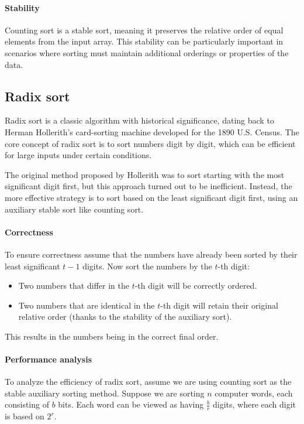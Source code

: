 \paragraph*{Stability}
Counting sort is a stable sort, meaning it preserves the relative order of equal elements from the input array. 
This stability can be particularly important in scenarios where sorting must maintain additional orderings or properties of the data.

\subsection{Radix sort}
Radix sort is a classic algorithm with historical significance, dating back to Herman Hollerith's card-sorting machine developed for the 1890 U.S. Census. 
The core concept of radix sort is to sort numbers digit by digit, which can be efficient for large inputs under certain conditions.

The original method proposed by Hollerith was to sort starting with the most significant digit first, but this approach turned out to be inefficient. 
Instead, the more effective strategy is to sort based on the least significant digit first, using an auxiliary stable sort like counting sort.

\paragraph*{Correctness}
To ensure correctness assume that the numbers have already been sorted by their least significant $t-1$ digits.
Now sort the numbers by the $t$-th digit: 
\begin{itemize}
    \item Two numbers that differ in the $t$-th digit will be correctly ordered.
    \item Two numbers that are identical in the $t$-th digit will retain their original relative order (thanks to the stability of the auxiliary sort).
\end{itemize}
This results in the numbers being in the correct final order.

\paragraph*{Performance analysis}
To analyze the efficiency of radix sort, assume we are using counting sort as the stable auxiliary sorting method. 
Suppose we are sorting $n$ computer words, each consisting of $b$ bits. 
Each word can be viewed as having $\frac{b}{r}$ digits, where each digit is based on $2^r$. 

